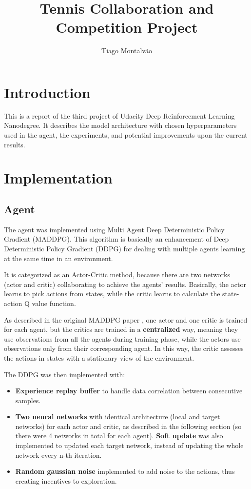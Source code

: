\documentclass{article}
\title{Tennis Collaboration and Competition Project}
\author{Tiago Montalvão}
\begin{document}
\maketitle
\justify

\section{Introduction}

This is a report of the third project of Udacity Deep Reinforcement Learning Nanodegree. It describes the model architecture with chosen hyperparameters used in the agent, the experiments, and potential improvements upon the current results.

\section{Implementation}
\subsection{Agent}

The agent was implemented using Multi Agent Deep Deterministic Policy Gradient (MADDPG). This algorithm is basically an enhancement of Deep Deterministic Policy Gradient (DDPG) for dealing with multiple agents learning at the same time in an environment.

It is categorized as an Actor-Critic method, because there are two networks (actor and critic) collaborating to achieve the agents' results. Basically, the actor learns to pick actions from states, while the critic learns to calculate the state-action Q value function.

As described in the original MADDPG paper \cite{lowe2017multiagent}, one actor and one critic is trained for each agent, but the critics are trained in a \textbf{centralized} way, meaning they use observations from all the agents during training phase, while the actors use observations only from their corresponding agent. In this way, the critic assesses the actions in states with a stationary view of the environment.

The DDPG was then implemented with:

\begin{itemize}
    \item \textbf{Experience replay buffer} to handle data correlation between consecutive samples.
    \item \textbf{Two neural networks} with identical architecture (local and target networks) for each actor and critic, as described in the following section (so there were 4 networks in total for each agent). \textbf{Soft update} was also implemented to updated each target network, instead of updating the whole network every n-th iteration.
    \item \textbf{Random gaussian noise} implemented to add noise to the actions, thus creating incentives to exploration.
\end{itemize}
\end{document}

